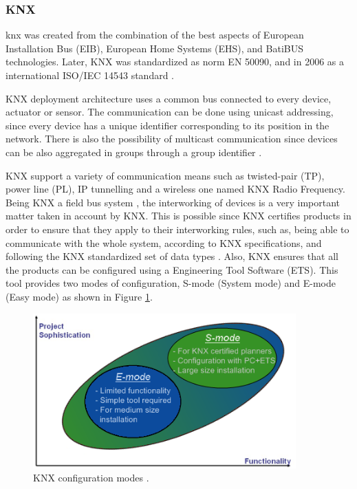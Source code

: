 \subsubsection{KNX}

\ac{knx} was created from the combination of the best aspects of European Installation Bus (EIB), European Home Systems (EHS), and BatiBUS technologies. Later, KNX was standardized as norm EN 50090, and in 2006 as a international ISO/IEC 14543 standard \cite{Domingues2016}.

KNX deployment architecture uses a common bus connected to every device, actuator or sensor. The communication can be done using unicast addressing, since every device has a unique identifier corresponding to its position in the network. There is also the possibility of multicast communication since devices can be also aggregated in groups through a group identifier \cite{Kastner2005}.  

KNX support a variety of communication means such as twisted-pair (TP), power line (PL), IP tunnelling and a wireless one named KNX
Radio Frequency. Being KNX a field bus system \cite{Osorio}, the interworking of devices is a very important matter taken in account by KNX. This is possible since KNX certifies products in order to ensure that they apply to their interworking rules, such as, being able to communicate with the whole system, according to KNX specifications, and following the KNX standardized set of data types \cite{Interworking_KNX}. Also, KNX ensures that all the products can be configured using a Engineering Tool Software (ETS). This tool provides two modes of configuration, S-mode (System mode) and E-mode (Easy mode) as shown in Figure \ref{fig:knx_modes}. 

\begin{figure}[H]
	\centering
	\includegraphics[width=0.9\textwidth]{figures/knxmodes.png}
	\caption{KNX configuration modes \cite{knx}. }
	\label{fig:knx_modes}
\end{figure}
 
